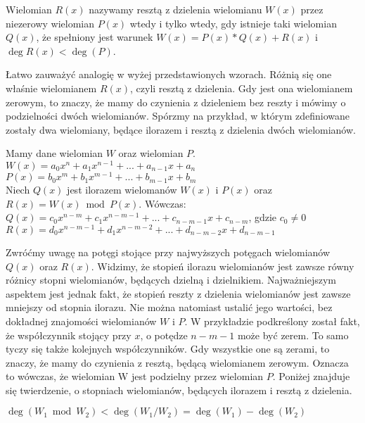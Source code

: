 \begin{definition}
	$ $\\
	Wielomian $R(x)$ nazywamy resztą z dzielenia wielomianu $W(x)$ przez niezerowy wielomian $P(x)$ wtedy i tylko wtedy, gdy istnieje taki wielomian $Q(x)$, że spełniony jest warunek $W(x) = P(x) * Q(x) + R(x)$ i $\deg R(x) < \deg(P)$.
\end{definition}

Łatwo zauważyć analogię w wyżej przedstawionych wzorach. Różnią się one właśnie wielomianem $R(x)$, czyli resztą z dzielenia. Gdy jest ona wielomianem zerowym, to znaczy, że mamy do czynienia z dzieleniem bez reszty i mówimy o podzielności dwóch wielomianów. Spórzmy na przykład, w którym zdefiniowane zostały dwa wielomiany, będące ilorazem i resztą z dzielenia dwóch wielomianów.

\begin{example}
	$ $\\
	Mamy dane wielomian $W$ oraz wielomian $P$. \\
	$W(x) = a_0x^n + a_1x^{n-1} + ... + a_{n-1}x + a_n$ \\
	$P(x) = b_0x^m + b_1x^{m-1} + ... + b_{m-1}x + b_m$ \\
	Niech $Q(x)$ jest ilorazem wielomanów $W(x)$ i $P(x)$ oraz $R(x) = W(x)\bmod P(x)$. Wówczas: \\
	$Q(x) = c_0x^{n-m} + c_1x^{n-m-1} + ... + c_{n-m-1}x + c_{n-m}$, gdzie $c_0\ne 0$ \\
	$R(x) = d_0x^{n-m-1} + d_1x^{n-m-2} + ... + d_{n-m-2}x + d_{n-m-1}$
\end{example}

Zwróćmy uwagę na potęgi stojące przy najwyższych potęgach wielomianów $Q(x)$ oraz $R(x)$. Widzimy, że stopień ilorazu wielomianów jest zawsze równy różnicy stopni wielomianów, będących dzielną i dzielnikiem. Najważniejszym aspektem jest jednak fakt, że stopień reszty z dzielenia wielomianów jest zawsze mniejszy od stopnia ilorazu. Nie można natomiast ustalić jego wartości, bez dokładnej znajomości wielomianów $W$ i $P$. W przykładzie podkreślony został fakt, że współczynnik stojący przy $x$, o potędze $n-m-1$ może być zerem. To samo tyczy się także kolejnych współczynników. Gdy wszystkie one są zerami, to znaczy, że mamy do czynienia z resztą, będącą wielomianem zerowym. Oznacza to wówczas, że wielomian W jest podzielny przez wielomian $P$. Poniżej znajduje się twierdzenie, o stopniach wielomianów, będących ilorazem i resztą z dzielenia.

\begin{theorem}
	$ $\\
	$\deg(W_1 \bmod W_2) < \deg(W_1 / W_2) = \deg(W_1) - \deg(W_2)$
\end{theorem}

